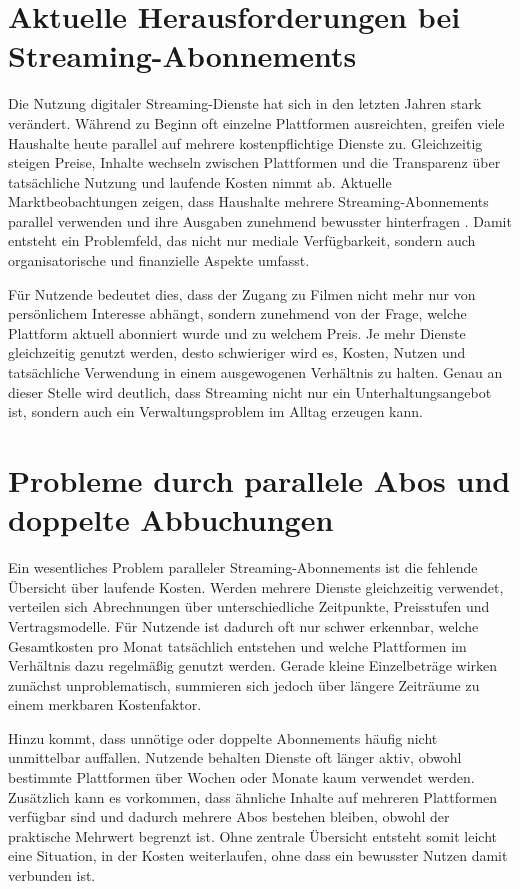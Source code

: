 \section{Aktuelle Herausforderungen bei Streaming-Abonnements}
Die Nutzung digitaler Streaming-Dienste hat sich in den letzten Jahren stark verändert. Während zu Beginn oft einzelne Plattformen ausreichten, greifen viele Haushalte heute parallel auf mehrere kostenpflichtige Dienste zu. Gleichzeitig steigen Preise, Inhalte wechseln zwischen Plattformen und die Transparenz über tatsächliche Nutzung und laufende Kosten nimmt ab. Aktuelle Marktbeobachtungen zeigen, dass Haushalte mehrere Streaming-Abonnements parallel verwenden und ihre Ausgaben zunehmend bewusster hinterfragen \cite{deloitte_digital_media_2025}. Damit entsteht ein Problemfeld, das nicht nur mediale Verfügbarkeit, sondern auch organisatorische und finanzielle Aspekte umfasst.

Für Nutzende bedeutet dies, dass der Zugang zu Filmen nicht mehr nur von persönlichem Interesse abhängt, sondern zunehmend von der Frage, welche Plattform aktuell abonniert wurde und zu welchem Preis. Je mehr Dienste gleichzeitig genutzt werden, desto schwieriger wird es, Kosten, Nutzen und tatsächliche Verwendung in einem ausgewogenen Verhältnis zu halten. Genau an dieser Stelle wird deutlich, dass Streaming nicht nur ein Unterhaltungsangebot ist, sondern auch ein Verwaltungsproblem im Alltag erzeugen kann.

\section{Probleme durch parallele Abos und doppelte Abbuchungen}
Ein wesentliches Problem paralleler Streaming-Abonnements ist die fehlende Übersicht über laufende Kosten. Werden mehrere Dienste gleichzeitig verwendet, verteilen sich Abrechnungen über unterschiedliche Zeitpunkte, Preisstufen und Vertragsmodelle. Für Nutzende ist dadurch oft nur schwer erkennbar, welche Gesamtkosten pro Monat tatsächlich entstehen und welche Plattformen im Verhältnis dazu regelmäßig genutzt werden. Gerade kleine Einzelbeträge wirken zunächst unproblematisch, summieren sich jedoch über längere Zeiträume zu einem merkbaren Kostenfaktor.

Hinzu kommt, dass unnötige oder doppelte Abonnements häufig nicht unmittelbar auffallen. Nutzende behalten Dienste oft länger aktiv, obwohl bestimmte Plattformen über Wochen oder Monate kaum verwendet werden. Zusätzlich kann es vorkommen, dass ähnliche Inhalte auf mehreren Plattformen verfügbar sind und dadurch mehrere Abos bestehen bleiben, obwohl der praktische Mehrwert begrenzt ist. Ohne zentrale Übersicht entsteht somit leicht eine Situation, in der Kosten weiterlaufen, ohne dass ein bewusster Nutzen damit verbunden ist.

